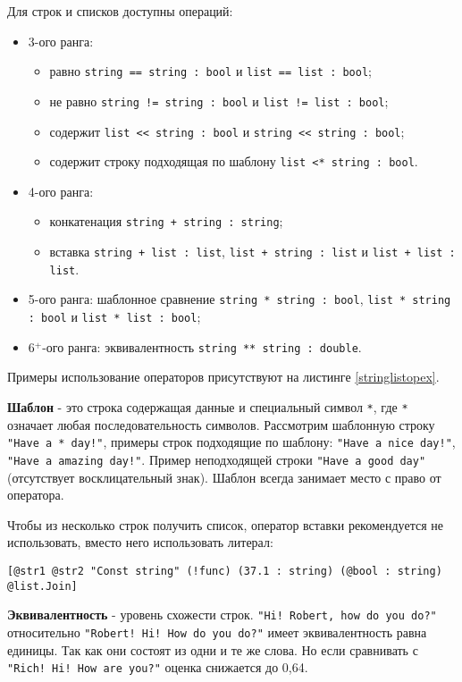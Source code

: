 \documentclass[a4paper, 14pt]{extarticle}
\newenvironment{icItems}
	{ \begin{itemize} [noitemsep,nolistsep] }
	{ \end{itemize} }
\begin{document}
	Для строк и списков доступны операций:
\begin{icItems}
	\item 3-ого ранга:
		\begin{icItems}
		\item равно \lstinline`string == string : bool` и \lstinline`list == list : bool`;
		\item не равно \lstinline`string != string : bool` и \lstinline`list != list : bool`;
		\item содержит \lstinline`list << string : bool` и \lstinline`string << string : bool`;
		\item содержит строку подходящая по шаблону \lstinline`list <* string : bool`.
		\end{icItems}
	\item 4-ого ранга:
		\begin{icItems}
		\item конкатенация \lstinline`string + string : string`;
		\item вставка \lstinline`string + list : list`, \lstinline`list + string : list` и \lstinline`list + list : list`.
		\end{icItems}
	\item 5-ого ранга: шаблонное сравнение \lstinline`string * string : bool`, \lstinline`list * string : bool` и \lstinline`list * list : bool`;
	\item 6$^+$-ого ранга: эквивалентность \lstinline`string ** string : double`.
\end{icItems}

	Примеры использование операторов присутствуют на листинге \ref{stringlistopex}.

	{\bf Шаблон} - это строка содержащая данные и специальный символ \lstinline`*`, где \lstinline`*` означает любая последовательность символов. Рассмотрим шаблонную строку \lstinline`"Have a * day!"`, примеры строк подходящие по шаблону: \lstinline`"Have a nice day!"`, \lstinline`"Have a amazing day!"`. Пример неподходящей строки \lstinline`"Have a good day"` (отсутствует восклицательный знак). Шаблон всегда занимает место с право от оператора.
	
	Чтобы из несколько строк получить список, оператор вставки рекомендуется не использовать, вместо него использовать литерал:
\begin{lstlisting}[numbers=none]
[@str1 @str2 "Const string" (!func) (37.1 : string) (@bool : string) @list.Join]
\end{lstlisting}

	{\bf Эквивалентность} - уровень схожести строк. \lstinline`"Hi! Robert, how do you do?"` относительно \lstinline`"Robert! Hi! How do you do?"` имеет эквивалентность равна единицы. Так как они состоят из одни и те же слова. Но если сравнивать с  \lstinline`"Rich! Hi! How are you?"` оценка снижается до 0,64.
\end{document}
